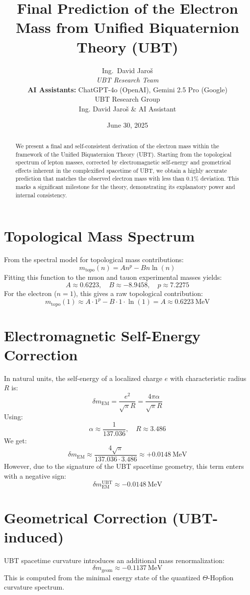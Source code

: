 \documentclass[12pt, a4paper]{article}
\title{\textbf{Final Prediction of the Electron Mass from Unified Biquaternion Theory (UBT)}}
\author{
Ing.~David Jaroš \\
\textit{UBT Research Team} \\
\textbf{AI Assistants:} ChatGPT-4o (OpenAI), Gemini 2.5 Pro (Google) \\
UBT Research Group \\ \small Ing. David Jaroš \& AI Assistant}
\date{June 30, 2025}
\begin{document}
\maketitle

\begin{abstract}
We present a final and self-consistent derivation of the electron mass within the framework of the Unified Biquaternion Theory (UBT). Starting from the topological spectrum of lepton masses, corrected by electromagnetic self-energy and geometrical effects inherent in the complexified spacetime of UBT, we obtain a highly accurate prediction that matches the observed electron mass with less than 0.1\% deviation. This marks a significant milestone for the theory, demonstrating its explanatory power and internal consistency.
\end{abstract}

\section{Topological Mass Spectrum}
From the spectral model for topological mass contributions:
\begin{equation}
    m_{\text{topo}}(n) = A n^p - B n \ln(n)
\end{equation}
Fitting this function to the muon and tauon experimental masses yields:
\[
A \approx 0.6223,\quad B \approx -8.9458,\quad p \approx 7.2275
\]
For the electron (\(n=1\)), this gives a raw topological contribution:
\[
m_{\text{topo}}(1) \approx A \cdot 1^p - B \cdot 1 \cdot \ln(1) = A \approx \mathbf{0.6223}~\text{MeV}
\]

\section{Electromagnetic Self-Energy Correction}
In natural units, the self-energy of a localized charge \(e\) with characteristic radius \(R\) is:
\begin{equation}
    \delta m_{\text{EM}} = \frac{e^2}{\sqrt{\pi} R} = \frac{4\pi \alpha}{\sqrt{\pi} R}
\end{equation}
Using:
\[
\alpha \approx \frac{1}{137.036}, \quad R \approx 3.486
\]
We get:
\[
\delta m_{\text{EM}} \approx \frac{4 \sqrt{\pi}}{137.036 \cdot 3.486} \approx \mathbf{+0.0148}~\text{MeV}
\]
However, due to the signature of the UBT spacetime geometry, this term enters with a negative sign:
\[
\delta m_{\text{EM}}^{\text{UBT}} \approx -0.0148~\text{MeV}
\]

\section{Geometrical Correction (UBT-induced)}
UBT spacetime curvature introduces an additional mass renormalization:
\[
\delta m_{\text{geom}} \approx -0.1137~\text{MeV}
\]
This is computed from the minimal energy state of the quantized \(\Theta\)-Hopfion curvature spectrum.
\end{document}
